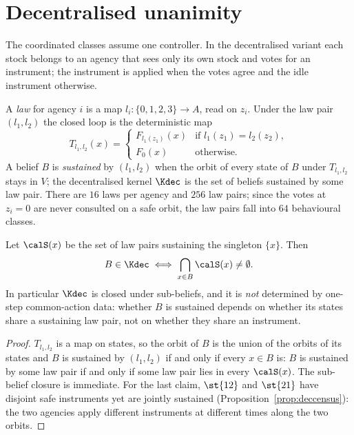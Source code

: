 \section{Decentralised unanimity}\label{sec:dec}

The coordinated classes assume one controller. In the decentralised variant each stock belongs to an agency that sees only its own stock and votes for an instrument; the instrument is applied when the votes agree and the idle instrument otherwise.

\begin{definition}\label{def:laws}
A \emph{law} for agency $i$ is a map $l_i:\{0,1,2,3\}\to A$, read on $z_i$. Under the law pair $(l_1,l_2)$ the closed loop is the deterministic map
\[
T_{l_1,l_2}(x)=\begin{cases}F_{l_1(z_1)}(x) & \text{if } l_1(z_1)=l_2(z_2),\\ F_0(x) & \text{otherwise.}\end{cases}
\]
A belief $B$ is \emph{sustained} by $(l_1,l_2)$ when the orbit of every state of $B$ under $T_{l_1,l_2}$ stays in $V$; the decentralised kernel $\Kdec$ is the set of beliefs sustained by some law pair. There are $16$ laws per agency and $256$ law pairs; since the votes at $z_i=0$ are never consulted on a safe orbit, the law pairs fall into $64$ behavioural classes.
\end{definition}

\begin{theorem}\label{thm:factor}
Let $\calS(x)$ be the set of law pairs sustaining the singleton $\{x\}$. Then
\[
B\in\Kdec\iff\bigcap_{x\in B}\calS(x)\neq\emptyset .
\]
In particular $\Kdec$ is closed under sub-beliefs, and it is \emph{not} determined by one-step common-action data: whether $B$ is sustained depends on whether its states share a sustaining law pair, not on whether they share an instrument.
\end{theorem}

\begin{proof}
$T_{l_1,l_2}$ is a map on states, so the orbit of $B$ is the union of the orbits of its states and $B$ is sustained by $(l_1,l_2)$ if and only if every $x\in B$ is: $B$ is sustained by some law pair if and only if some law pair lies in every $\calS(x)$. The sub-belief closure is immediate. For the last claim, $\st{12}$ and $\st{21}$ have disjoint safe instruments yet are jointly sustained (Proposition~\ref{prop:deccensus}): the two agencies apply different instruments at different times along the two orbits.
\end{proof}

